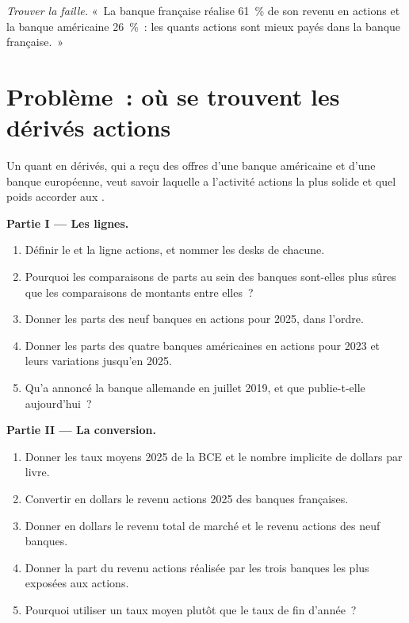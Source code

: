 \begin{exercise}[$\star\star\star$]\label{exo:in:bank-markets-divisions:8}
\emph{Trouver la faille.} «~La banque française réalise 61~\% de son revenu en actions et la banque américaine
26~\%~: les quants actions sont mieux payés dans la banque française.~»
\end{exercise}

\section{Problème~: où se trouvent les dérivés actions}

\begin{problem}\label{pb:in:bank-markets-divisions:1}
Un quant en dérivés, qui a reçu des offres d'une banque américaine et d'une banque européenne, veut savoir laquelle a l'activité actions la plus solide
et quel poids accorder aux .

\medskip\noindent\textbf{Partie I --- Les lignes.}
\begin{enumerate}
\item Définir le  et la ligne actions, et nommer les desks de chacune.
\item Pourquoi les comparaisons de parts au sein des banques sont-elles plus sûres que les comparaisons de montants entre elles~?
\item Donner les parts des neuf banques en actions pour 2025, dans l'ordre.
\item Donner les parts des quatre banques américaines en actions pour 2023 et leurs variations jusqu'en 2025.
\item Qu'a annoncé la banque allemande en juillet 2019, et que publie-t-elle aujourd'hui~?
\end{enumerate}

\medskip\noindent\textbf{Partie II --- La conversion.}
\begin{enumerate}[resume]
\item Donner les taux moyens 2025 de la BCE et le nombre implicite de dollars par livre.
\item Convertir en dollars le revenu actions 2025 des banques françaises.
\item Donner en dollars le revenu total de marché et le revenu actions des neuf banques.
\item Donner la part du revenu actions réalisée par les trois banques les plus exposées aux actions.
\item Pourquoi utiliser un taux moyen plutôt que le taux de fin d'année~?
\end{enumerate}


\end{problem}
